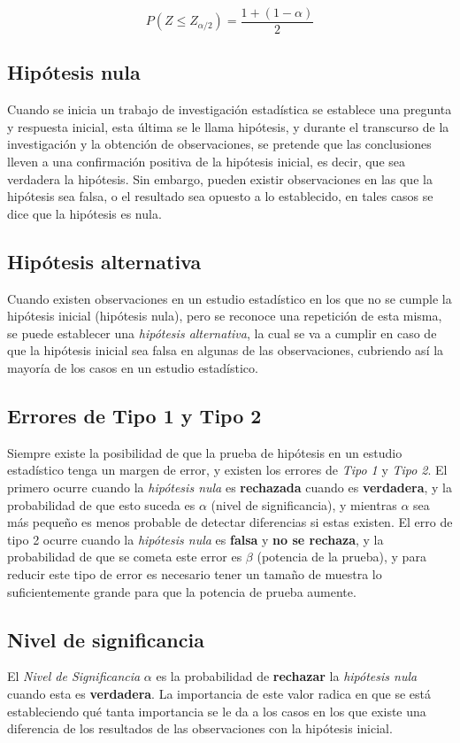 \documentclass[a4paper, 12pt]{article}
\begin{document}
\begin{equation}
    P(Z\leq Z_{\alpha/2})=\frac{1+(1-\alpha)}{2}
\end{equation}

\subsection{Hipótesis nula}
Cuando se inicia un trabajo de investigación estadística se establece una pregunta y respuesta inicial, esta última se le llama hipótesis, y durante el transcurso de la investigación y la obtención de observaciones, se pretende que las conclusiones lleven a una confirmación positiva de la hipótesis inicial, es decir, que sea verdadera la hipótesis. Sin embargo, pueden existir observaciones en las que la hipótesis sea falsa, o el resultado sea opuesto a lo establecido, en tales casos se dice que la hipótesis es nula.

\subsection{Hipótesis alternativa}
Cuando existen observaciones en un estudio estadístico en los que no se cumple la hipótesis inicial (hipótesis nula), pero se reconoce una repetición de esta misma, se puede establecer una \emph{hipótesis alternativa}, la cual se va a cumplir en caso de que la hipótesis inicial sea falsa en algunas de las observaciones, cubriendo así la mayoría de los casos en un estudio estadístico.

\subsection{Errores de Tipo 1 y Tipo 2}
Siempre existe la posibilidad de que la prueba de hipótesis en un estudio estadístico tenga un margen de error, y existen los errores de \emph{Tipo 1} y \emph{Tipo 2}. El primero ocurre cuando la \emph{hipótesis nula} es \textbf{rechazada} cuando es \textbf{verdadera}, y la probabilidad de que esto suceda es $\alpha$ (nivel de significancia), y mientras $\alpha$ sea más pequeño es menos probable de detectar diferencias si estas existen. El erro de tipo 2 ocurre cuando la \emph{hipótesis nula} es \textbf{falsa} y \textbf{no se rechaza}, y la probabilidad de que se cometa este error es $\beta$ (potencia de la prueba), y para reducir este tipo de error es necesario tener un tamaño de muestra lo suficientemente grande para que la potencia de prueba aumente.

\subsection{Nivel de significancia}
El \emph{Nivel de Significancia} $\alpha$ es la probabilidad de \textbf{rechazar} la \emph{hipótesis nula} cuando esta es \textbf{verdadera}. La importancia de este valor radica en que se está estableciendo qué tanta importancia se le da a los casos en los que existe una diferencia de los resultados de las observaciones con la hipótesis inicial.
\end{document}
